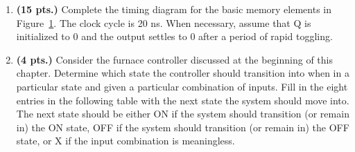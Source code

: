 \begin{enumerate}
\item {\bf (15 pts.)} Complete the timing diagram for the basic memory elements in 
Figure~\ref{fig:ExTim2}.  The clock cycle is 20 ns. When necessary, 
assume that Q is initialized to 0 and the output settles to 0 after 
a period of rapid toggling. 
\begin{figure}[ht]
\caption{}
\label{fig:ExTim2}
\end{figure}

\begin{solution}{
\begin{figure}[ht]
\end{figure}
} \end{solution}


\item {\bf (4 pts.)} Consider the furnace 
controller discussed at the beginning of this chapter.  Determine 
which state the controller should transition into when in a particular state
and given a particular combination of inputs.  
Fill in the eight entries in the following table with the next state
the system should move into.  The next state should be either ON if the 
system should transition (or remain in) the ON state, OFF if the system 
should transition (or remain in) the OFF state, or X if the input 
combination is meaningless. 


\end{enumerate}
